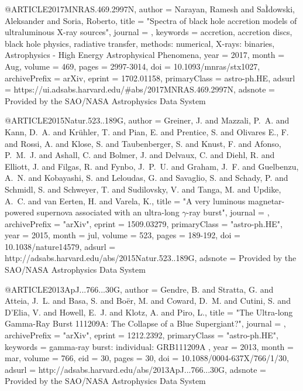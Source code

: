 \documentclass[twocolumn,tighten]{aastex63}
\begin{document}
{{{{@ARTICLE{2017MNRAS.469.2997N,
       author = {{Narayan}, Ramesh and {Sa{\`I}{\textsection}dowski}, Aleksander and
        {Soria}, Roberto},
        title = "{Spectra of black hole accretion models of ultraluminous X-ray sources}",
      journal = {\mnras},
     keywords = {accretion, accretion discs, black hole physics, radiative transfer, methods: numerical, X-rays: binaries, Astrophysics - High Energy Astrophysical Phenomena},
         year = 2017,
        month = Aug,
       volume = {469},
        pages = {2997-3014},
          doi = {10.1093/mnras/stx1027},
archivePrefix = {arXiv},
       eprint = {1702.01158},
 primaryClass = {astro-ph.HE},
       adsurl = {https://ui.adsabs.harvard.edu/\#abs/2017MNRAS.469.2997N},
      adsnote = {Provided by the SAO/NASA Astrophysics Data System}
}


@ARTICLE{2015Natur.523..189G,
   author = {{Greiner}, J. and {Mazzali}, P.~A. and {Kann}, D.~A. and {Kr{\"u}hler}, T. and 
	{Pian}, E. and {Prentice}, S. and {Olivares E.}, F. and {Rossi}, A. and 
	{Klose}, S. and {Taubenberger}, S. and {Knust}, F. and {Afonso}, P.~M.~J. and 
	{Ashall}, C. and {Bolmer}, J. and {Delvaux}, C. and {Diehl}, R. and 
	{Elliott}, J. and {Filgas}, R. and {Fynbo}, J.~P.~U. and {Graham}, J.~F. and 
	{Guelbenzu}, A.~N. and {Kobayashi}, S. and {Leloudas}, G. and 
	{Savaglio}, S. and {Schady}, P. and {Schmidl}, S. and {Schweyer}, T. and 
	{Sudilovsky}, V. and {Tanga}, M. and {Updike}, A.~C. and {van Eerten}, H. and 
	{Varela}, K.},
    title = "{A very luminous magnetar-powered supernova associated with an ultra-long {$\gamma$}-ray burst}",
  journal = {\nat},
archivePrefix = "arXiv",
   eprint = {1509.03279},
 primaryClass = "astro-ph.HE",
     year = 2015,
    month = jul,
   volume = 523,
    pages = {189-192},
      doi = {10.1038/nature14579},
   adsurl = {http://adsabs.harvard.edu/abs/2015Natur.523..189G},
  adsnote = {Provided by the SAO/NASA Astrophysics Data System}
}

@ARTICLE{2013ApJ...766...30G,
   author = {{Gendre}, B. and {Stratta}, G. and {Atteia}, J.~L. and {Basa}, S. and 
	{Bo{\"e}r}, M. and {Coward}, D.~M. and {Cutini}, S. and {D'Elia}, V. and 
	{Howell}, E.~J. and {Klotz}, A. and {Piro}, L.},
    title = "{The Ultra-long Gamma-Ray Burst 111209A: The Collapse of a Blue Supergiant?}",
  journal = {\apj},
archivePrefix = "arXiv",
   eprint = {1212.2392},
 primaryClass = "astro-ph.HE",
 keywords = {gamma-ray burst: individual: GRB111209A },
     year = 2013,
    month = mar,
   volume = 766,
      eid = {30},
    pages = {30},
      doi = {10.1088/0004-637X/766/1/30},
   adsurl = {http://adsabs.harvard.edu/abs/2013ApJ...766...30G},
  adsnote = {Provided by the SAO/NASA Astrophysics Data System}
}

}}}}
\end{document}
